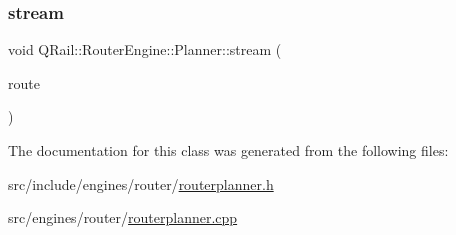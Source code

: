 \subsubsection{\texorpdfstring{stream}{stream}}
{\footnotesize\ttfamily void Q\+Rail\+::\+Router\+Engine\+::\+Planner\+::stream (\begin{DoxyParamCaption}\item[{\mbox{\hyperlink{classQRail_1_1RouterEngine_1_1Route}{Q\+Rail\+::\+Router\+Engine\+::\+Route}} $\ast$}]{route }\end{DoxyParamCaption})\hspace{0.3cm}{\ttfamily [signal]}}



The documentation for this class was generated from the following files\+:\begin{DoxyCompactItemize}
\item 
src/include/engines/router/\mbox{\hyperlink{routerplanner_8h}{routerplanner.\+h}}\item 
src/engines/router/\mbox{\hyperlink{routerplanner_8cpp}{routerplanner.\+cpp}}\end{DoxyCompactItemize}
